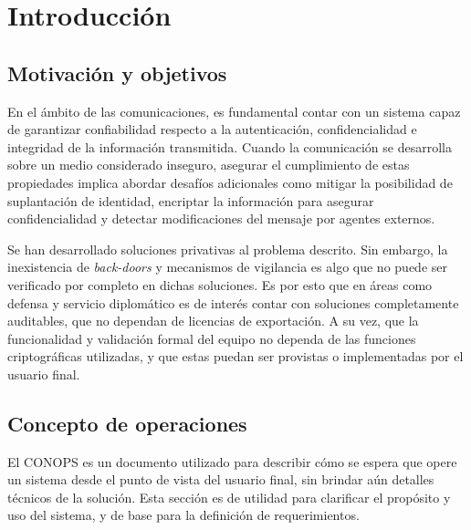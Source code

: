 \chapter{Introducción}
\section{Motivación y objetivos}
En el ámbito de las comunicaciones, es fundamental contar con un sistema capaz de garantizar confiabilidad respecto a la autenticación, confidencialidad e integridad de la información transmitida. Cuando la comunicación se desarrolla sobre un medio considerado inseguro, asegurar el cumplimiento de estas propiedades implica abordar desafíos adicionales como mitigar la posibilidad de suplantación de identidad, encriptar la información para asegurar confidencialidad y detectar modificaciones del mensaje por agentes externos.

Se han desarrollado soluciones privativas al problema descrito. Sin embargo, la inexistencia de \textit{back-doors} y mecanismos de vigilancia es algo que no puede ser verificado por completo en dichas soluciones. Es por esto que en áreas como defensa y servicio diplomático es de interés contar con soluciones completamente auditables, que no dependan de licencias de exportación. A su vez, que la funcionalidad y validación formal del equipo no dependa de las funciones criptográficas utilizadas, y que estas puedan ser provistas o implementadas por el usuario final.






\clearpage

\section{Concepto de operaciones}
El CONOPS es un documento utilizado para describir cómo se espera que opere un sistema desde el punto de vista del usuario final, sin brindar aún detalles técnicos de la solución. Esta sección es de utilidad para clarificar el propósito y uso del sistema, y de base para la definición de requerimientos.

